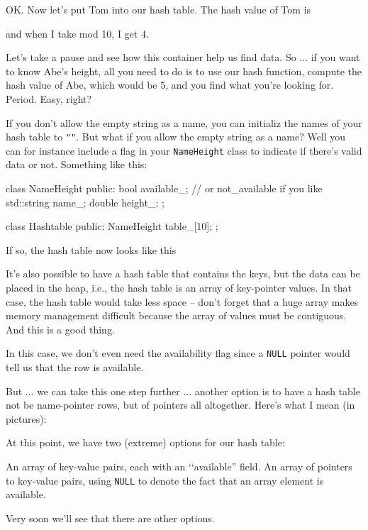 OK. 
Now let's put Tom into our hash table.
The hash value of Tom is

and when I take mod 10, I get 4.



Let's take a pause and see how 
this container help us find data.
So ... if you want to know Abe's height,
all you need to do is to use our hash function, 
compute the hash value of Abe, which would be 5,
and you find what you're looking for.
Period.
Easy, right?

If you don't allow the empty string as a name,
you can initializ the names of your 
hash table to \verb!""!.
But what if you allow the empty string
as a name?
Well you can for instance include a flag in your
\verb!NameHeight! class to indicate if there's valid data or not.
Something like this:
{\small
\begin{console}
class NameHeight
{
public:
    bool available_; // or not_available if you like
    std::string name_;
    double height_;
};

class Hashtable
{
public:
    NameHeight table_[10];
};
\end{console}
}
If so, the hash table now looks like this




It's also possible to have a hash table that contains
the keys, but the 
data can be placed in the heap, i.e.,
the hash table is an array of key-pointer values.
In that case, the hash table would take less space --
don't forget that a huge array makes memory management
difficult because the array of values must be contiguous.
And this is a good thing.


In this case, we don't even need the availability flag since a
\verb!NULL! pointer would tell us that the row is available.

But ... we can take this one step further ...
another option is to have a hash table not be 
name-pointer rows,
but of pointers all altogether.
Here's what I mean (in pictures):



At this point, we have two (extreme) options for our hash table:
\begin{tightlist}
\li An array of key-value pairs, each with an \lq\lq available''
    field.
\li An array of pointers to key-value pairs, using \verb!NULL!
    to denote the fact that an array element is available.
\end{tightlist} 

Very soon we'll see that there are other options.

\newpage
